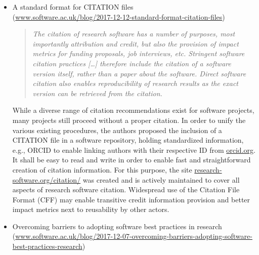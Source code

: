 \documentclass[11pt,letterpaper]{article}
\begin{document}
\begin{itemize}
\item A standard format for CITATION files\\(\href{https://www.software.ac.uk/blog/2017-12-12-standard-format-citation-files}{www.software.ac.uk/blog/2017-12-12-standard-format-citation-files})
\begin{quote}\textit{
The citation of research software has a number of purposes, most importantly attribution and credit, but also the provision of impact metrics for funding proposals, job interviews, etc. Stringent software citation practices [\ldots] therefore include the citation of a software version itself, rather than a paper about the software. Direct software citation also enables reproducibility of research results as the exact version can be retrieved from the citation. }
\end{quote}
While a diverse range of citation recommendations exist for software projects, many projects still proceed without a proper citation. In order to unify the various existing  procedures, the authors proposed the inclusion of a CITATION file in a software repository, holding standardized information, e.g., ORCID to enable linking authors with their respective ID from \href{https://orcid.org}{orcid.org}. It shall be easy to read and write in order to enable fast and straightforward creation of citation information. For this purpose, the site \href{https://research-software.org/citation/}{research-software.org/citation/} was created and is actively maintained to cover all aspects of research software citation. Widespread use of the Citation File Format (CFF) may enable transitive credit information provision and better impact metrics next to reusability by other actors.


\item Overcoming barriers to adopting software best practices in research (\href{https://www.software.ac.uk/blog/2017-12-07-overcoming-barriers-adopting-software-best-practices-research}{www.software.ac.uk/blog/2017-12-07-overcoming-barriers-adopting-software-best-practices-research})


\end{itemize}
\end{document}
